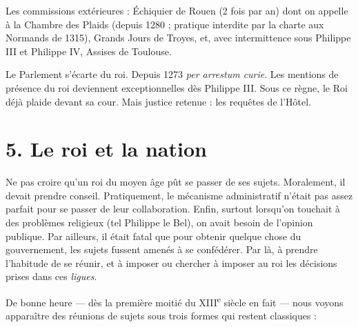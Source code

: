 \documentclass[french,twoside]{book} %
\newcommand{\labelchar}[1]{{\color{rubric}\bf #1}}
\newcommand\chapteropen{} %
\newcommand\chaptercont{} %
\newcommand\chapterclose{} %
\renewcommand\chapteropen{} %
\renewcommand\chaptercont{} %
\renewcommand\chapterclose{} %
\begin{document}
Les commissions extérieures : Échiquier de Rouen (2 fois par an) dont on appelle à la Chambre des Plaids (depuis 1280 ; pratique interdite par la charte aux Normands de 1315), Grands Jours de Troyes, et, avec intermittence sous Philippe III et Philippe IV, Assises de Toulouse.\par
Le Parlement s’écarte du roi. Depuis 1273 \emph{per arrestum curie}. Les mentions de présence du roi deviennent exceptionnelles dès Philippe III. Sous ce règne, le Roi déjà plaide devant sa cour. Mais justice retenue : les requêtes de l’Hôtel.
\chapterclose


\chapteropen
\chapter[5. Le roi et la nation]{\textsc{5. }Le roi et la nation}
\label{c05}

\chaptercont
\noindent \labelchar{1)}  
\label{p45} Ne pas croire qu’un roi du moyen âge pût se passer de ses sujets. Moralement, il devait prendre conseil. Pratiquement, le mécanisme administratif n’était pas assez parfait pour se passer de leur collaboration. Enfin, surtout lorsqu’on touchait à des problèmes religieux (tel Philippe le Bel), on avait besoin de l’opinion publique. Par ailleurs, il était fatal que pour obtenir quelque chose du gouvernement, les sujets fussent amenés à se confédérer. Par là, à prendre l’habitude de se réunir, et à imposer ou chercher à imposer au roi les décisions prises dans ces \emph{ligues}.\par
\bigbreak
\noindent \labelchar{2)} De bonne heure — dès la première moitié du XIII\textsuperscript{e} siècle en fait — nous voyons apparaître des réunions de sujets sous trois formes qui restent classiques :\par
\end{document}
